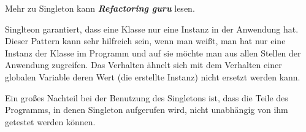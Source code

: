 Mehr zu Singleton kann \textit{\textbf{Refactoring guru}} lesen.

Singlteon garantiert, dass eine Klasse nur eine Instanz in der Anwendung hat.
Dieser Pattern kann sehr hilfreich sein, wenn man weißt, man hat nur eine Instanz der Klasse im Programm 
und auf sie möchte man aus allen Stellen der Anwendung zugreifen.
Das Verhalten ähnelt sich mit dem Verhalten einer 
globalen Variable deren Wert (die erstellte Instanz) nicht ersetzt werden kann.

Ein großes Nachteil bei der Benutzung des Singletons ist, 
dass die Teile des Programms, in denen Singleton aufgerufen wird, nicht unabhängig von ihm getestet werden können.